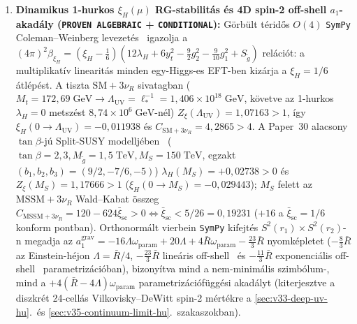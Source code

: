 \documentclass[11pt,a4paper]{article}
\begin{document}
{\begin{enumerate}
\item \textbf{Dinamikus 1-hurkos $\xi_H(\mu)$ RG-stabilitás és 4D spin-2 off-shell $a_1$-akadály (\texttt{PROVEN ALGEBRAIC} + \texttt{CONDITIONAL}):} Görbült téridős $O(4)$ \texttt{SymPy} Coleman--Weinberg levezetés~\cite{ParkerToms2009} igazolja a $(4\pi)^2\beta_{\xi_H} = (\xi_H - \frac{1}{6})(12\lambda_H + 6y_t^2 - \frac{9}{2}g_2^2 - \frac{9}{10}g_1^2 + S_{\tilde g})$ relációt: a multiplikatív linearitás minden egy-Higgs-es EFT-ben kizárja a $\xi_H = 1/6$ átlépést. A tiszta $\mathrm{SM}+3\nu_R$ sivatagban ($M_t=172{,}69\;\mathrm{GeV}\to\Lambda_{\mathrm{UV}}=\ell_*^{-1}=1{,}406\times 10^{18}\;\mathrm{GeV}$, követve az 1-hurkos $\lambda_H=0$ metszést $8{,}74\times 10^6\;\mathrm{GeV}$-nél) $Z_\xi(\Lambda_{\mathrm{UV}})=1{,}07163>1$, így $\xi_H(0\to\Lambda_{\mathrm{UV}})=-0{,}011938$ és $C_{\mathrm{SM}+3\nu_R}=4{,}2865>4$. A Paper~30 alacsony $\tan\beta$-jú Split-SUSY modelljében~\cite{GiudiceRomanino2004} ($\tan\beta=2{,}3, M_{\tilde g}=1{,}5\;\mathrm{TeV}, M_S=150\;\mathrm{TeV}$, egzakt $(b_1,b_2,b_3)=(9/2,-7/6,-5)$) $\lambda_H(M_S)=+0{,}02738>0$ és $Z_\xi(M_S)=1{,}17666>1$ ($\xi_H(0\to M_S)=-0{,}029443$); $M_S$ felett az $\mathrm{MSSM}+3\nu_R$ Wald--Kabat összeg $C_{\mathrm{MSSM}+3\nu_R}=120-624\bar\xi_{\mathrm{sc}}>0\iff\bar\xi_{\mathrm{sc}}<5/26=0{,}19231$ ($+16$ a $\bar\xi_{\mathrm{sc}}=1/6$ konform pontban). Orthonormált vierbein \texttt{SymPy} kifejtés $S^2(r_1)\times S^2(r_2)$-n megadja az $a_1^{\mathrm{grav}} = -16\Lambda\omega_{\mathrm{param}} + 20\Lambda + 4\bar R\omega_{\mathrm{param}} - \frac{23}{3}\bar R$ nyomképletet ($-\frac{8}{3}\bar R$ az Einstein-héjon $\Lambda=\bar R/4$, $-\frac{23}{3}\bar R$ lineáris off-shell~\cite{FursaevSolodukhin1995} és $-\frac{11}{3}\bar R$ exponenciális off-shell~\cite{Falls2015} parametrizációban), bizonyítva mind a nem-minimális szimbólum-, mind a $+4(\bar R-4\Lambda)\omega_{\mathrm{param}}$ parametrizációfüggési akadályt (kiterjesztve a diszkrét 24-cellás Vilkovisky--DeWitt spin-2 mértékre a \ref{sec:v33-deep-uv-hu}.~és \ref{sec:v35-continuum-limit-hu}.~szakaszokban).

\end{enumerate}}
\end{document}
